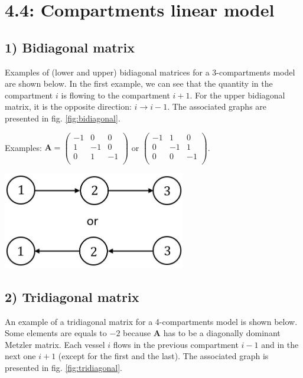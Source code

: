 \section*{4.4: Compartments linear model}

\subsection*{1) Bidiagonal matrix}
Examples of (lower and upper) bidiagonal matrices for a 3-compartments model are shown below. In the first example, we can see that the quantity in the compartment $i$ is flowing to the compartment $i+1$. For the upper bidiagonal matrix, it is the opposite direction: $i \rightarrow i-1$. The associated graphs are presented in fig. \ref{fig:bidiagonal}.\\

\begin{minipage}[l]{0.55\linewidth}
	Examples: $
	\mathbf{A}=\begin{pmatrix}
	-1 & 0 & 0\\
	1 & -1 & 0\\
	0 & 1 & -1\\
	\end{pmatrix}$ or 
	$\begin{pmatrix}
	-1 & 1 & 0\\
	0 & -1 & 1\\
	0 & 0 & -1\\
	\end{pmatrix}$.
\end{minipage}
\begin{minipage}[r]{0.4\textwidth}
	\centering
	\includegraphics[width=0.6\textwidth]{bidiag}
	\label{fig:bidiagonal}
\end{minipage}

\subsection*{2) Tridiagonal matrix}
An example of a tridiagonal matrix for a 4-compartments model is shown below. Some elements are equals to $-2$ because $\mathbf{A}$ has to be a diagonally dominant Metzler matrix. Each vessel $i$ flows in the previous compartment $i-1$ and in the next one $i+1$ (except for the first and the last). The associated graph is presented in fig. \ref{fig:tridiagonal}.\\

